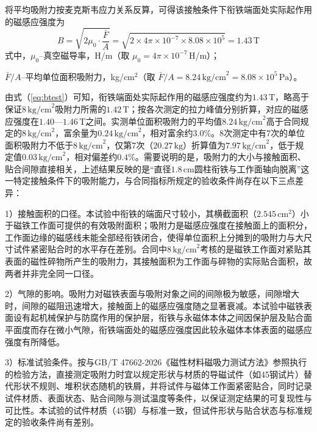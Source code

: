 将平均吸附力按麦克斯韦应力关系反算，可得该接触条件下衔铁端面处实际起作用的磁感应强度为
\begin{equation}
	B=\sqrt{2\mu_0\cdot\frac{\bar F}{A}}=\sqrt{2\times 4\pi\times 10^{-7}\times 8.08\times 10^{5}}=1.43\,\text{T}
	\label{eq:btest}
\end{equation}
式中，$\mu_0$--真空磁导率，H/m（取 $\mu_0=4\pi\times 10^{-7}$\,H/m）；

$\bar F/A$--平均单位面积吸附力，kg/cm$^2$（取 $\bar F/A=8.24\,\text{kg/cm}^2=8.08\times 10^{5}\,\text{Pa}$）。

由式（\ref{eq:btest}）可知，衔铁端面处实际起作用的磁感应强度约为$1.43\,\text{T}$，略高于保证$8\,\text{kg/cm}^2$吸附力所需的$1.42\,\text{T}$；按各次测定的拉力峰值分别折算，对应的磁感应强度在$1.40$—$1.46\,\text{T}$之间。实测单位面积吸附力的平均值$8.24\,\text{kg/cm}^2$高于合同规定的$8\,\text{kg/cm}^2$，富余量为$0.24\,\text{kg/cm}^2$，相对富余约$3.0\%$。8次测定中有7次的单位面积吸附力不低于$8\,\text{kg/cm}^2$，仅第7次（$20.27\,\text{kg}$）折算值为$7.97\,\text{kg/cm}^2$，低于规定值$0.03\,\text{kg/cm}^2$，相对偏差约$0.4\%$。需要说明的是，吸附力的大小与接触面积、贴合间隙直接相关，上述结果反映的是“直径$1.8\,\text{cm}$圆柱衔铁与工作面轴向脱离”这一特定接触条件下的吸附能力，与合同指标所规定的验收条件尚存在以下三点差异：

1）接触面积的口径。本试验中衔铁的端面尺寸较小，其横截面积（$2.545\,\text{cm}^2$）小于磁铁工作面可提供的有效吸附面积；吸附力是磁感应强度在接触面上的面积分，工作面边缘的磁感线未能全部经衔铁闭合，使得单位面积上分摊到的吸附力与大尺寸试件紧密贴合时的水平存在差别。合同中$8\,\text{kg/cm}^2$考核的是磁铁工作面对紧贴其表面的磁性碎物所产生的吸附力，其接触面积为工作面与碎物的实际贴合面积，故两者并非完全同一口径。

2）气隙的影响。吸附力对磁铁表面与吸附对象之间的间隙极为敏感，间隙增大时，间隙的磁阻迅速增大，接触面上的磁感应强度随之显著衰减。本试验中磁铁表面设有起机械保护与防腐作用的保护层，衔铁与永磁体本体之间因保护层及贴合面平面度而存在微小气隙，衔铁端面处的磁感应强度因此较永磁体本体表面的磁感应强度有所降低。

3）标准试验条件。按与GB/T 47662-2026《磁性材料磁吸力测试方法》参照执行的检验方法，直接测定吸附力时宜以规定形状与材质的导磁试件（如45钢试片）替代形状不规则、堆积状态随机的铁屑，并将试件与磁体工作面紧密贴合，同时记录试件材质、表面状态、贴合间隙与测试温度等条件，以保证测定结果的可复现性与可比性。本试验的试件材质（45钢）与标准一致，但试件形状与贴合状态与标准规定的验收条件尚有差别。

